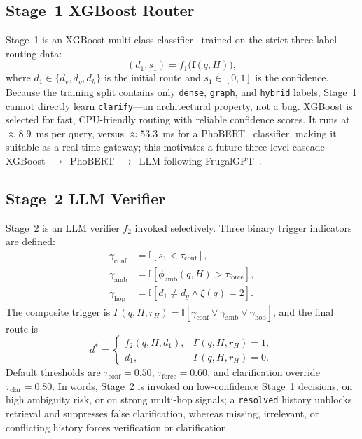 ﻿\documentclass[11pt,twocolumn]{article}
\begin{document}
\subsection{Stage~1 XGBoost Router}
\label{subsec:stage1}

Stage~1 is an XGBoost multi-class classifier~\cite{chen2016xgboost}
trained on the strict three-label routing data:
\begin{equation}
(d_1, s_1) = f_1\bigl(\mathbf{f}(q,H)\bigr),
\label{eq:stage1}
\end{equation}
where $d_1\in\{d_v,d_g,d_h\}$ is the initial route and
$s_1\in[0,1]$ is the confidence. Because the training split contains
only \texttt{dense}, \texttt{graph}, and \texttt{hybrid} labels,
Stage~1 cannot directly learn \texttt{clarify}---an architectural
property, not a bug. XGBoost is selected for fast, CPU-friendly
routing with reliable confidence scores. It runs at
$\approx\!8.9$~ms per query, versus $\approx\!53.3$~ms for a
PhoBERT~\cite{nguyen2020phobert} classifier, making it suitable as a
real-time gateway; this motivates a future three-level cascade
XGBoost~$\rightarrow$~PhoBERT~$\rightarrow$~LLM following
FrugalGPT~\cite{chen2023frugalgpt}.

\subsection{Stage~2 LLM Verifier}
\label{subsec:stage2}

Stage~2 is an LLM verifier $f_2$ invoked selectively. Three binary
trigger indicators are defined:
\begin{align}
\gamma_{\mathrm{conf}} &= \mathbb{I}[s_1 < \tau_{\mathrm{conf}}],
    \label{eq:gamma_conf}\\
\gamma_{\mathrm{amb}} &=
    \mathbb{I}[\phi_{\mathrm{amb}}(q,H) > \tau_{\mathrm{force}}],
    \label{eq:gamma_amb}\\
\gamma_{\mathrm{hop}} &=
    \mathbb{I}[d_1\neq d_g \wedge \xi(q)=2].
    \label{eq:gamma_hop}
\end{align}
The composite trigger is
$\Gamma(q,H,r_H) = \mathbb{I}[\gamma_{\mathrm{conf}} \vee
\gamma_{\mathrm{amb}} \vee \gamma_{\mathrm{hop}}]$,
and the final route is
\begin{equation}
d^* = \begin{cases}
f_2(q,H,d_1), & \Gamma(q,H,r_H)=1,\\
d_1, & \Gamma(q,H,r_H)=0.
\end{cases}
\label{eq:final_route}
\end{equation}
Default thresholds are $\tau_{\mathrm{conf}}=0.50$,
$\tau_{\mathrm{force}}=0.60$, and clarification override
$\tau_{\mathrm{clar}}=0.80$. In words, Stage~2 is invoked on low-confidence
Stage~1 decisions, on high ambiguity risk, or on strong multi-hop signals;
a \texttt{resolved} history unblocks retrieval and suppresses false
clarification, whereas missing, irrelevant, or conflicting history forces
verification or clarification.
\end{document}

